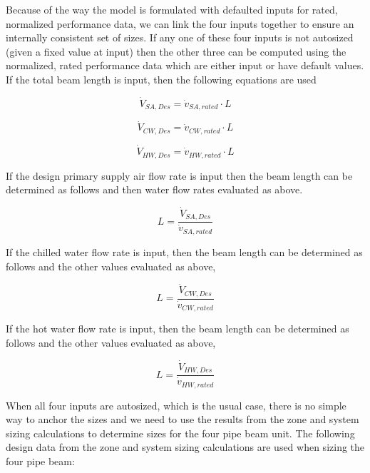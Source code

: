 Because of the way the model is formulated with defaulted inputs for rated, normalized performance data, we can link the four inputs together to ensure an internally consistent set of sizes. If any one of these four inputs is not autosized (given a fixed value at input) then the other three can be computed using the normalized, rated performance data which are either input or have default values. If the total beam length is input, then the following equations are used

\begin{equation}
  {\dot V_{SA,Des}} = {{\dot v_{SA,rated}} \cdot {L}}
\end{equation}

\begin{equation}
  {\dot V_{CW,Des}} = {{\dot v_{CW,rated}} \cdot {L}}
\end{equation} 
  
\begin{equation}
  {\dot V_{HW,Des}} = {{\dot v_{HW,rated}} \cdot {L}}
\end{equation}

If the design primary supply air flow rate is input then the beam length can be determined as follows and then water flow rates evaluated as above.

\begin{equation}
{L} = {\frac{{\dot V_{SA,Des}}}{{\dot v_{SA,rated}}}  }
\end{equation}

If the chilled water flow rate is input, then the beam length can be determined as follows and the other values evaluated as above,

\begin{equation}
{L} = {\frac{{\dot V_{CW,Des}}}{{\dot v_{CW,rated}}}  }
\end{equation}

If the hot water flow rate is input, then the beam length can be determined as follows and the other values evaluated as above,

\begin{equation}
{L} = {\frac{{\dot V_{HW,Des}}}{{\dot v_{HW,rated}}}  }
\end{equation}

When all four inputs are autosized, which is the usual case, there is no simple way to anchor the sizes and we need to use the results from the zone and system sizing calculations to determine sizes for the four pipe beam unit. The following design data from the zone and system sizing calculations are used when sizing the four pipe beam:

